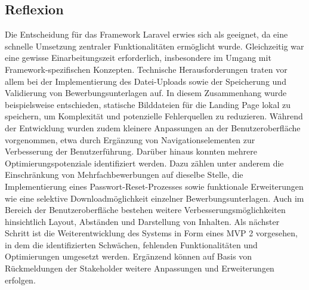 \subsection{Reflexion}
Die Entscheidung für das Framework Laravel erwies sich als geeignet, da eine schnelle Umsetzung zentraler Funktionalitäten ermöglicht wurde. 
Gleichzeitig war eine gewisse Einarbeitungszeit erforderlich, insbesondere im Umgang mit Framework-spezifischen Konzepten. 
Technische Herausforderungen traten vor allem bei der Implementierung des Datei-Uploads sowie der Speicherung und Validierung von Bewerbungsunterlagen auf. 
In diesem Zusammenhang wurde beispielsweise entschieden, statische Bilddateien für die Landing Page lokal zu speichern, um Komplexität und potenzielle Fehlerquellen zu reduzieren.
\newline
Während der Entwicklung wurden zudem kleinere Anpassungen an der Benutzeroberfläche vorgenommen, etwa durch Ergänzung von Navigationselementen zur Verbesserung der Benutzerführung. 
Darüber hinaus konnten mehrere Optimierungspotenziale identifiziert werden. 
Dazu zählen unter anderem die Einschränkung von Mehrfachbewerbungen auf dieselbe Stelle, die Implementierung eines Passwort-Reset-Prozesses sowie funktionale Erweiterungen wie eine selektive Downloadmöglichkeit einzelner Bewerbungsunterlagen. 
Auch im Bereich der Benutzeroberfläche bestehen weitere Verbesserungsmöglichkeiten hinsichtlich Layout, Abständen und Darstellung von Inhalten.
\newline
Als nächster Schritt ist die Weiterentwicklung des Systems in Form eines MVP 2 vorgesehen, in dem die identifizierten Schwächen, fehlenden Funktionalitäten und Optimierungen umgesetzt werden. 
Ergänzend können auf Basis von Rückmeldungen der Stakeholder weitere Anpassungen und Erweiterungen erfolgen.
